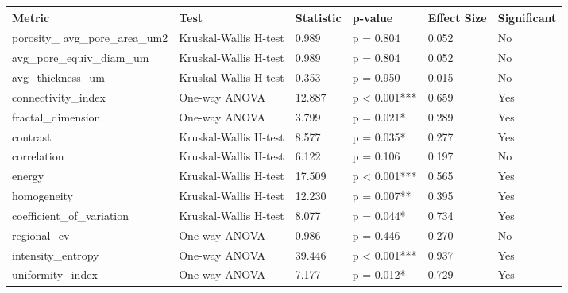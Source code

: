 \begin{tabular}{llllll}
\toprule
Metric & Test & Statistic & p-value & Effect Size & Significant \\
\midrule
porosity_%
avg_pore_area_um2 & Kruskal-Wallis H-test & 0.989 & p = 0.804 & 0.052 & No \\
avg_pore_equiv_diam_um & Kruskal-Wallis H-test & 0.989 & p = 0.804 & 0.052 & No \\
avg_thickness_um & Kruskal-Wallis H-test & 0.353 & p = 0.950 & 0.015 & No \\
connectivity_index & One-way ANOVA & 12.887 & p < 0.001*** & 0.659 & Yes \\
fractal_dimension & One-way ANOVA & 3.799 & p = 0.021* & 0.289 & Yes \\
contrast & Kruskal-Wallis H-test & 8.577 & p = 0.035* & 0.277 & Yes \\
correlation & Kruskal-Wallis H-test & 6.122 & p = 0.106 & 0.197 & No \\
energy & Kruskal-Wallis H-test & 17.509 & p < 0.001*** & 0.565 & Yes \\
homogeneity & Kruskal-Wallis H-test & 12.230 & p = 0.007** & 0.395 & Yes \\
coefficient_of_variation & Kruskal-Wallis H-test & 8.077 & p = 0.044* & 0.734 & Yes \\
regional_cv & One-way ANOVA & 0.986 & p = 0.446 & 0.270 & No \\
intensity_entropy & One-way ANOVA & 39.446 & p < 0.001*** & 0.937 & Yes \\
uniformity_index & One-way ANOVA & 7.177 & p = 0.012* & 0.729 & Yes \\
\bottomrule
\end{tabular}
